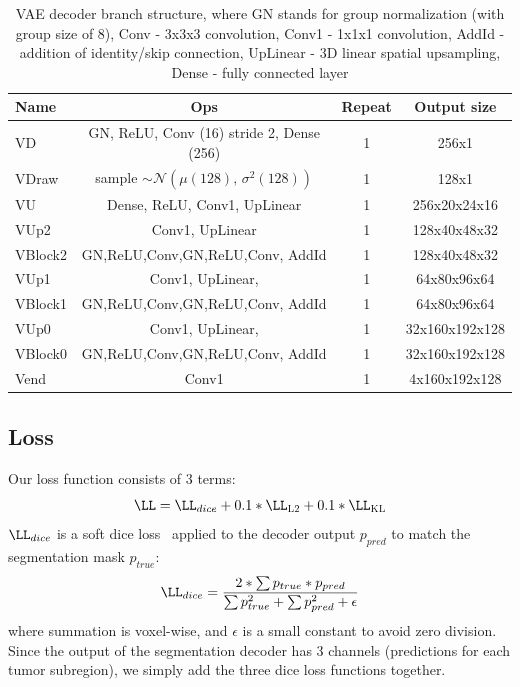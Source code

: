\documentclass[runningheads]{llncs}
\begin{document}
 \begin{table}
 	\centering
 	\caption{VAE decoder branch structure, where GN stands for group normalization (with group size of 8), Conv - 3x3x3 convolution, Conv1 - 1x1x1 convolution, AddId - addition of identity/skip connection, UpLinear - 3D linear spatial upsampling, Dense - fully connected layer }
 	\label{tab:vaebranch}
 	\begin{tabular}{|l|c|c|c|}
 		\hline
 		Name & Ops & Repeat &Output size    \\ \hline
 		VD &  GN, ReLU, Conv (16) stride 2, Dense (256) & 1 &  256x1 \\
 		VDraw & sample $\sim \mathcal{N}(\mu (128),\,\sigma^{2} (128))$ & 1 & 128x1 \\
 		VU &  Dense, ReLU, Conv1, UpLinear & 1 &  256x20x24x16 \\
		VUp2 & Conv1, UpLinear &  1 &128x40x48x32    \\
		VBlock2 & GN,ReLU,Conv,GN,ReLU,Conv, AddId & 1 & 128x40x48x32   \\
		VUp1 & Conv1, UpLinear, &  1 &64x80x96x64    \\
		VBlock1 & GN,ReLU,Conv,GN,ReLU,Conv, AddId & 1 & 64x80x96x64   \\
		VUp0 & Conv1, UpLinear, &  1 &32x160x192x128    \\
		VBlock0 & GN,ReLU,Conv,GN,ReLU,Conv, AddId & 1 & 32x160x192x128  \\
 		Vend & Conv1 & 1 & 4x160x192x128 \\
 		\hline
 	\end{tabular}
 \end{table}

 
 \subsection{Loss}
 Our loss function consists of 3 terms:
  \begin{equation}
 \label{eq:loss}
 \LL =\LL_{dice} + 0.1*\LL_{\textsc{L2}} + 0.1*\LL_{\textsc{KL}}   
 \end{equation}
$\LL_{dice}$ is a soft dice loss~\cite{Milletari16} applied to the  decoder output $p_{pred}$ to match the segmentation mask $p_{true}$:
   \begin{equation}
  \label{eq:dice}
  \LL_{dice}  = \frac{2*\sum p_{true} * p_{pred} }{\sum p_{true}^2 + \sum p_{pred}^2 + \epsilon}   
  \end{equation}
where summation is voxel-wise, and $\epsilon$ is a small constant to avoid zero division. Since the output of the segmentation decoder has 3 channels (predictions for each tumor subregion), we simply add the three dice loss functions together. 
\end{document}
